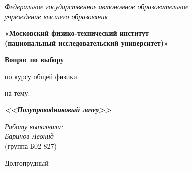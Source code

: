 \thispagestyle{empty}
\begin{center}
    \textit{Федеральное государственное автономное образовательное\\ учреждение высшего образования }

    \vspace{0.5ex}

        \textbf{«Московский физико-технический институт\\ (национальный исследовательский университет)»}
\end{center}

\vspace{10ex}

\begin{center}
    \vspace{13ex}

    \textbf{Вопрос по выбору}

    \vspace{1ex}

    по курсу общей физики

    на тему:

    \textbf{\textit{<<Полупроводниковый лазер>>}}

    \vspace{30ex}

    \begin{flushright}
        \noindent
        \textit{Работу выполнили:}\\  

        \textit{Баринов Леонид}\\(группа Б02-827)
    \end{flushright}
    \vfill
    Долгопрудный \\ \the\year{}
\newpage
\setcounter{page}{1}
\fancyhead[R]{\nouppercase{\leftmark}}	
\end{center}
